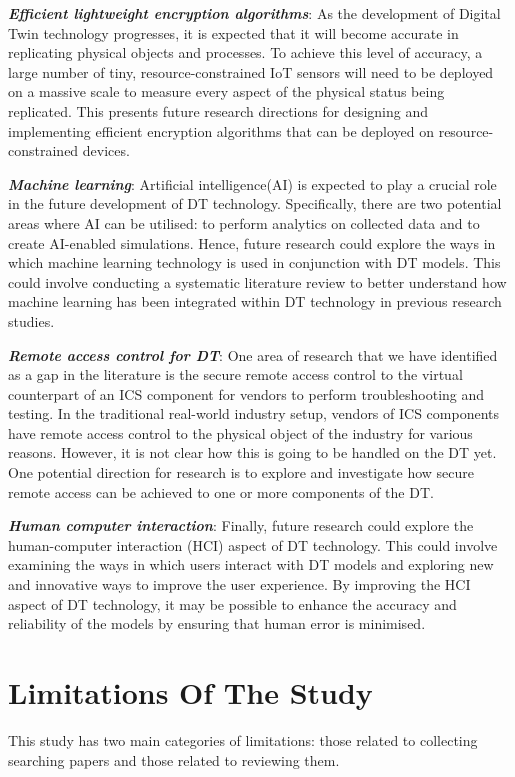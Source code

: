 \textbf{\textit{Efficient lightweight encryption algorithms}}: As the development of Digital Twin technology progresses, it is expected that it will become accurate in replicating physical objects and processes. To achieve this level of accuracy, a large number of tiny, resource-constrained IoT sensors will need to be deployed on a massive scale to measure every aspect of the physical status being replicated. This presents future research directions for designing and implementing efficient encryption algorithms that can be deployed on resource-constrained devices.


\textbf{\textit{Machine learning}}: Artificial intelligence(AI) is expected to play a crucial role in the future development of DT technology. Specifically, there are two potential areas where AI can be utilised: to perform analytics on collected data and to create AI-enabled simulations. Hence, future research could explore the ways in which machine learning technology is used in conjunction with DT models. This could involve conducting a systematic literature review to better understand how machine learning has been integrated within DT technology in previous research studies.

\textbf{\textit{Remote access control for DT}}: One area of research that we have identified as a gap in the literature is the secure remote access control to the virtual counterpart of an ICS component for vendors to perform troubleshooting and testing. In the traditional real-world industry setup, vendors of ICS components have remote access control to the physical object of the industry for various reasons. However, it is not clear how this is going to be handled on the DT yet. One potential direction for research is to explore and investigate how secure remote access can be achieved to one or more components of the DT.

\textbf{\textit{Human computer interaction}}: Finally, future research could explore the human-computer interaction (HCI) aspect of DT technology. This could involve examining the ways in which users interact with DT models and exploring new and innovative ways to improve the user experience. By improving the HCI aspect of DT technology, it may be possible to enhance the accuracy and reliability of the models by ensuring that human error is minimised.

\section{Limitations Of The Study}
% 
This study has two main categories of limitations: those related to collecting searching papers and those related to reviewing them.

